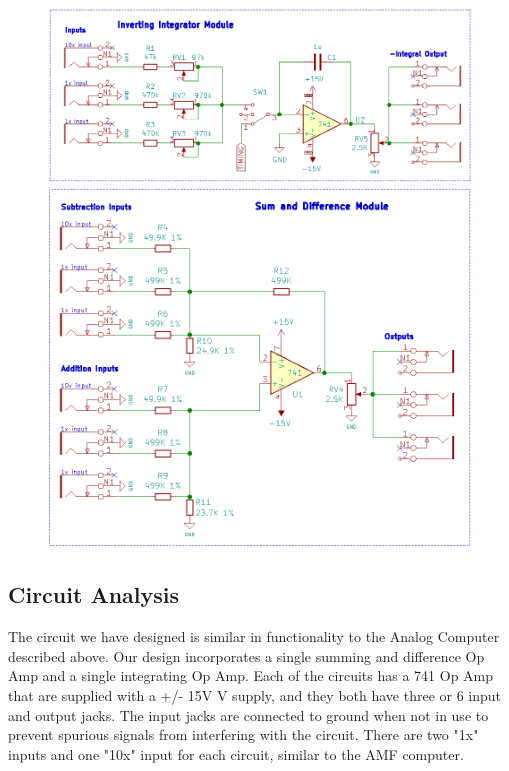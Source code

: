 \documentclass[11pt]{article}
\begin{document}
	\begin{figure}[H]
		\centering
		\includegraphics[width=6.5in]{images/schematic_integrator.png}
		
		\includegraphics[width=6.5in]{images/schematic_sum_diff.png}
	\end{figure}

	
	\subsection*{Circuit Analysis}
	The circuit we have designed is similar in functionality to the Analog Computer described above. Our design incorporates a single summing and difference Op Amp and a single integrating Op Amp. Each of the circuits has a 741 Op Amp that are supplied with a +/- 15V V supply, and they both have three or 6 input and output jacks.  The input jacks are connected to ground when not in use to prevent spurious signals from interfering with the circuit. There are two "1x" inputs and one "10x" input for each circuit, similar to the AMF computer.
	
\end{document}
